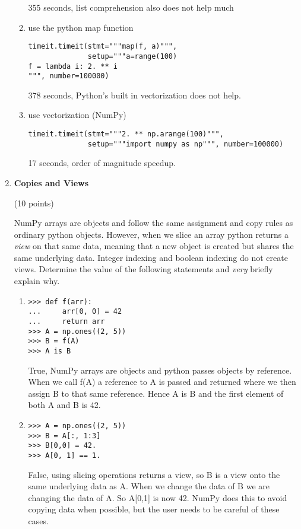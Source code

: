 \documentclass{article}
\newcounter{points}
\newcommand\setpoints[1]{\addtocounter{points}{#1}(#1 points)}
\begin{document}
\begin{enumerate}
\begin{enumerate}
355 seconds, list comprehension also does not help much

\item use the python map function
\begin{verbatim}
timeit.timeit(stmt="""map(f, a)""", 
              setup="""a=range(100)
f = lambda i: 2. ** i
""", number=100000)
\end{verbatim}
378 seconds, Python's built in vectorization does not help. 


\item use vectorization (NumPy)

\begin{verbatim}
timeit.timeit(stmt="""2. ** np.arange(100)""", 
              setup="""import numpy as np""", number=100000)
\end{verbatim}
17 seconds, order of magnitude speedup.
\end{enumerate}

\item \textbf{Copies and Views} \setpoints{10}

NumPy arrays are objects and follow the same assignment and copy rules as ordinary python objects. However, when we slice an array python returns a \textit{view} on that same data, meaning that a new object is created but shares the same underlying data. Integer indexing and boolean indexing do not create views. Determine the value of the following statements and \textit{very }briefly explain why. 
\begin{enumerate}


\item  

\begin{verbatim}
>>> def f(arr):
...     arr[0, 0] = 42
...     return arr
>>> A = np.ones((2, 5))
>>> B = f(A)
>>> A is B
\end{verbatim}
True, NumPy arrays are objects and python passes objects by reference. When we call f(A) a reference to A is passed and returned where we then assign B to that same reference. Hence A is B and the first element of both A and B is 42.
\item  

\begin{verbatim}
>>> A = np.ones((2, 5))
>>> B = A[:, 1:3]
>>> B[0,0] = 42.
>>> A[0, 1] == 1.
\end{verbatim}
False, using slicing operations returns a view, so B is a view onto the same underlying data as A. When we change the data of B we are changing the data of A. So A[0,1] is now 42. NumPy does this to avoid copying data when possible, but the user needs to be careful of these cases.



\end{enumerate}
\end{enumerate}
\end{document}
